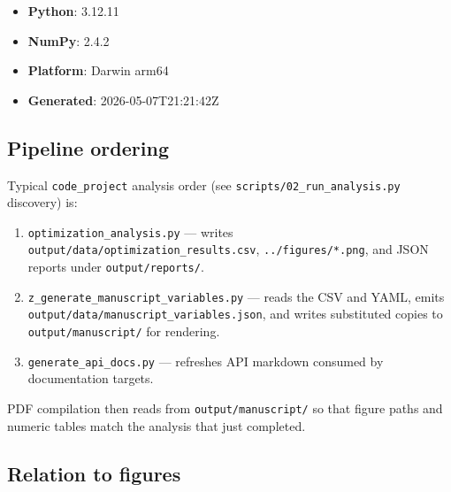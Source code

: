\documentclass[
]{article}
\providecommand{\tightlist}{%
  \setlength{\itemsep}{0pt}\setlength{\parskip}{0pt}}
\begin{document}
\begin{itemize}
\tightlist
\item
  \textbf{Python}: 3.12.11
\item
  \textbf{NumPy}: 2.4.2
\item
  \textbf{Platform}: Darwin arm64
\item
  \textbf{Generated}: 2026-05-07T21:21:42Z
\end{itemize}

\subsection{Pipeline ordering}\label{pipeline-ordering}

Typical \texttt{code\_project} analysis order (see
\texttt{scripts/02\_run\_analysis.py} discovery) is:

\begin{enumerate}
\def\labelenumi{\arabic{enumi}.}
\tightlist
\item
  \texttt{optimization\_analysis.py} --- writes
  \texttt{output/data/optimization\_results.csv},
  \texttt{../figures/*.png}, and JSON reports under
  \texttt{output/reports/}.
\item
  \texttt{z\_generate\_manuscript\_variables.py} --- reads the CSV and
  YAML, emits \texttt{output/data/manuscript\_variables.json}, and
  writes substituted copies to \texttt{output/manuscript/} for
  rendering.
\item
  \texttt{generate\_api\_docs.py} --- refreshes API markdown consumed by
  documentation targets.
\end{enumerate}

PDF compilation then reads from \texttt{output/manuscript/} so that
figure paths and numeric tables match the analysis that just completed.

\subsection{Relation to figures}\label{relation-to-figures}
\end{document}
